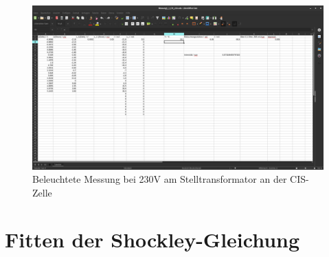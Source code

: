\begin{figure}[h]
    \captionsetup{justification=centering,margin=2cm}
    \centering
    \includegraphics[angle = 90, width = 12cm]{Bilder/Daten/MessunngCIS230.png}
    \caption{Beleuchtete Messung bei 230V am Stelltransformator an der CIS-Zelle}
\end{figure}



















\section{Fitten der Shockley-Gleichung}

